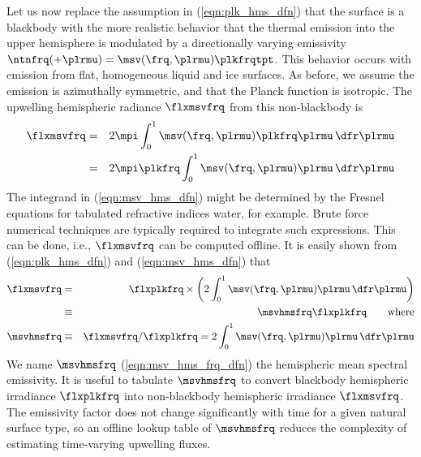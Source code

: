 \documentclass[12pt]{article}
\begin{document}
Let us now replace the assumption in (\ref{eqn:plk_hms_dfn}) that 
the surface is a blackbody with the more realistic behavior that the thermal
emission into the upper hemisphere is modulated by a directionally
varying emissivity $\ntnfrq (+\plrmu) = \msv(\frq,\plrmu) \plkfrqtpt$.
This behavior occurs with emission from flat, homogeneous liquid and ice surfaces.
As before, we assume the emission is azimuthally symmetric, and that the
Planck function is isotropic. 
The upwelling hemispheric radiance $\flxmsvfrq$ from this non-blackbody is
\begin{eqnarray} 
\flxmsvfrq & = & 2 \mpi \int_{0}^{1} \msv(\frq,\plrmu) \plkfrq \plrmu \,\dfr\plrmu \nonumber \\
& = & 2 \mpi \plkfrq \int_{0}^{1} \msv(\frq,\plrmu) \plrmu \,\dfr\plrmu
\label{eqn:msv_hms_dfn}
\end{eqnarray}
The integrand in (\ref{eqn:msv_hms_dfn}) might be determined by
the Fresnel equations for tabulated refractive indices water, for example.
Brute force numerical techniques are typically required to integrate such expressions.
This can be done, i.e., $\flxmsvfrq$ can be computed offline.
It is easily shown from  (\ref{eqn:plk_hms_dfn}) and  (\ref{eqn:msv_hms_dfn}) that
\begin{eqnarray} 
\flxmsvfrq & = & \flxplkfrq \times \left( 2\int_{0}^{1} \msv(\frq,\plrmu) \plrmu \,\dfr\plrmu \right) \nonumber \\
& \equiv & \msvhmsfrq \flxplkfrq \qquad \mbox{where} \nonumber \\
\msvhmsfrq & \equiv &  \flxmsvfrq/\flxplkfrq = 2\int_{0}^{1} \msv(\frq,\plrmu) \plrmu \,\dfr\plrmu
\label{eqn:msv_hms_frq_dfn}
\end{eqnarray}
We name $\msvhmsfrq$ (\ref{eqn:msv_hms_frq_dfn}) the hemispheric mean spectral emissivity.
It is useful to tabulate $\msvhmsfrq$ to convert blackbody hemispheric irradiance $\flxplkfrq$ 
into non-blackbody hemispheric irradiance $\flxmsvfrq$.
The emissivity factor does not change significantly with time
for a given natural surface type, so an offline lookup table of $\msvhmsfrq$
reduces the complexity of estimating time-varying upwelling fluxes.
\end{document}
